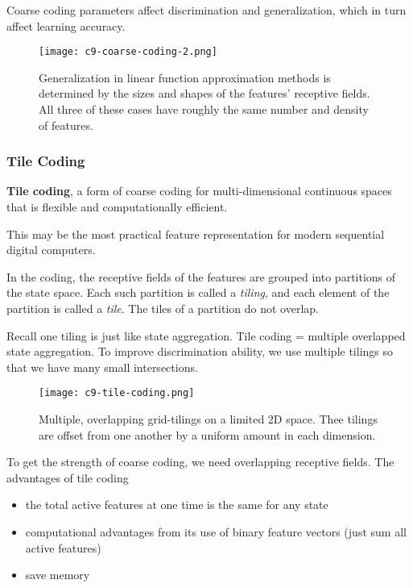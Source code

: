\documentclass[sutton_barto_notes.tex]{subfiles}
\begin{document}
Coarse coding parameters affect discrimination and generalization, which in turn affect learning accuracy.

\begin{figure}[h!]
  \texttt{[image: c9-coarse-coding-2.png]}
  \caption{Generalization in linear function approximation methods is determined by the sizes and shapes of the features' receptive fields. All three of these cases have roughly the same number and density of features.}
  \label{fig:coarse-coding-2}
\end{figure}

\clearpage %
\newpage
\subsubsection{Tile Coding}

\begin{definition}
\textbf{Tile coding}, a form of coarse coding for multi-dimensional continuous spaces that is flexible and computationally efficient.
\end{definition}
This may be the most practical feature representation for modern sequential digital computers.

In the coding, the receptive fields of the features are grouped into partitions of the state space. Each such partition is called a \textit{tiling}, and each element of the partition is called a \textit{tile}. The tiles of a partition do not overlap.

Recall one tiling is just like state aggregation. Tile coding = multiple overlapped state aggregation. To improve discrimination ability, we use multiple tilings so that we have many small intersections.

\begin{figure}[h!]
  \texttt{[image: c9-tile-coding.png]}
  \caption{Multiple, overlapping grid-tilings on a limited 2D space. Thee tilings are offset from one another by a uniform amount in each dimension.}
  \label{fig:tile-coding}
\end{figure}

To get the strength of coarse coding, we need overlapping receptive fields. The advantages of tile coding
\begin{itemize}
\item the total active features at one time is the same for any state
\item computational advantages from its use of binary feature vectors (just sum all active features)
\item save memory
\end{itemize}
\end{document}
